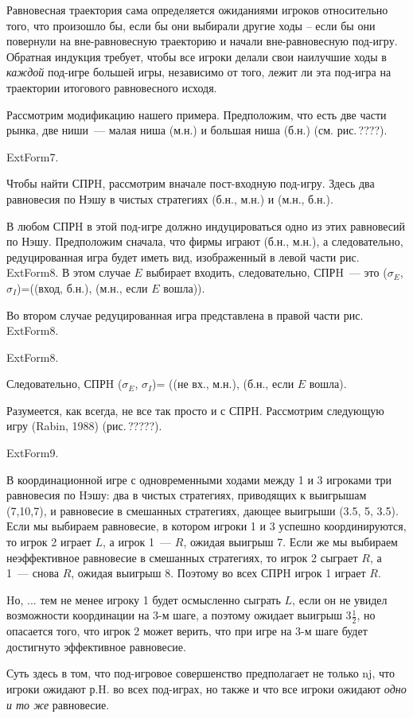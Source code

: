 \documentclass[12pt]{book}
\begin{document}
Равновесная траектория сама определяется ожиданиями игроков
относительно того, что произошло бы, если бы они выбирали другие ходы --
если бы они повернули на вне-равновесную траекторию и начали
вне-равновесную под-игру. Обратная индукция требует, чтобы все
игроки делали свои наилучшие ходы в \emph{каждой} под-игре большей игры,
независимо от того, лежит ли эта под-игра на траектории итогового
равновесного исходя.

Рассмотрим модификацию нашего примера. Предположим, что есть две
части рынка, две ниши~--- малая ниша (м.н.) и большая ниша (б.н.)
(см. рис.\,????).


ExtForm7.


Чтобы найти СПРH, рассмотрим вначале пост-входную
под-игру. Здесь два равновесия по Нэшу в чистых стратегиях (б.н.,
м.н.) и (м.н., б.н.).

В любом СПРH в этой под-игре должно индуцироваться одно из этих
равновесий по Нэшу. Предположим сначала, что  фирмы играют (б.н.,
м.н.), а следовательно, редуцированная игра будет иметь вид,
изображенный в левой части рис.\,ExtForm8. В этом случае $E$ выбирает входить,
следовательно, СПРH~--- это ($\sigma_E$, $\sigma_I$)=((вход, б.н.),
(м.н., если $E$ вошла)).

Во втором случае редуцированная игра представлена в правой части рис.\,ExtForm8.


ExtForm8.


Следовательно, СПРH ($\sigma_E$, $\sigma_I$)= ((не вх., м.н.),
(б.н., если $E$ вошла).

Разумеется, как всегда, не все так просто и с СПРH. Рассмотрим
следующую игру (Rabin, 1988) (рис.\,?????).


ExtForm9.



В координационной игре с одновременными ходами между 1 и
3 игроками три равновесия по Hэшу:  два в чистых стратегиях,
приводящих к выигрышам (7,10,7), и равновесие в смешанных
стратегиях, дающее выигрыши (3.5, 5, 3.5). Если мы выбираем
равновесие, в котором игроки 1 и 3 успешно координируются, то игрок
2 играет $L$, а игрок 1~--- $R$, ожидая выигрыш 7. Если же мы
выбираем неэффективное равновесие в смешанных стратегиях, то игрок 2
сыграет $R$, а 1~--- снова $R$, ожидая выигрыш 8. Поэтому во всех
СПРH игрок 1 играет $R$.

Hо, ... тем не менее игроку 1 будет осмысленно сыграть $L$, если он
не
 увидел возможности координации на 3-м шаге, а поэтому ожидает
выигрыш $3\frac{1}{2}$, но опасается того, что игрок 2 может верить,
что при игре на 3-м шаге будет достигнуто эффективное равновесие.

Суть здесь в том, что под-игровое совершенство
предполагает не только nj, что игроки ожидают р.H. во всех под-играх,
но также и что все игроки ожидают {\it одно и то же} равновесие.
\end{document}
